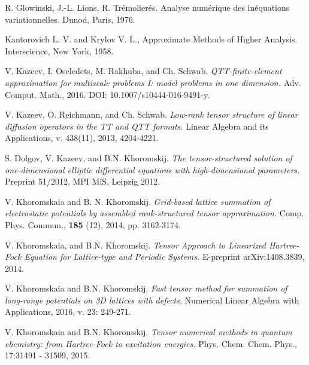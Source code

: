 \documentclass[amstex,amstext,amsfonts,epsf,12pt] {amsart}
\begin{document}
\begin{thebibliography}{99}
R. Glowinski, J.-L. Lions, R. Tr\'emolier\'es.
Analyse num\'erique des in\'equations variationnelles.
Dunod, Paris, 1976. 

Kantorovich L. V. and Krylov V. L., Approximate
Methods of Higher Analysis. Interscience, New York, 1958.

V. Kazeev, I. Oseledets, M. Rakhuba, and Ch. Schwab.
\emph{QTT-finite-element approximation for multiscale
problems I: model problems in one dimension.}
Adv. Comput. Math., 2016. DOI: 10.1007/s10444-016-9491-y.


V. Kazeev,  O. Reichmann, and Ch. Schwab.
\emph{Low-rank tensor structure of linear diffusion operators in the TT and QTT formats.}
Linear Algebra and its Applications, v. 438(11), 2013, 4204-4221.

 S. Dolgov, V. Kazeev, and B.N. Khoromskij.
\emph{The tensor-structured solution of one-dimensional elliptic differential equations 
with high-dimensional parameters.}
Preprint 51/2012, MPI MiS, Leipzig 2012.

 V. Khoromskaia and B. N. Khoromskij.
\emph{Grid-based lattice summation of electrostatic potentials by assembled rank-structured 
tensor approximation.} Comp. Phys. Commun., {\bf 185} (12), 2014, pp. 3162-3174. 

 V. Khoromskaia, and B.N. Khoromskij.
\emph{Tensor Approach to Linearized Hartree-Fock Equation  for Lattice-type and Periodic Systems.}
E-preprint arXiv:1408.3839, 2014.


 V. Khoromskaia and B.N. Khoromskij.
\emph{Fast tensor method for summation of long-range potentials on 3D lattices with defects}.
Numerical Linear Algebra with Applications, 2016, v. 23: 249-271. 

 V. Khoromskaia and B.N. Khoromskij.
\emph{Tensor numerical methods in quantum chemistry: from Hartree-Fock to excitation energies.}
Phys. Chem. Chem. Phys., 17:31491 - 31509, 2015. %



\end{thebibliography}
\end{document}
